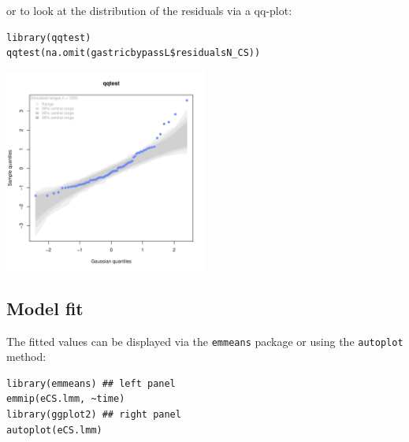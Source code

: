 \documentclass[12pt]{article}
\begin{document}
or to look at the distribution of the residuals via a qq-plot:
\lstset{language=r,label= ,caption= ,captionpos=b,numbers=none}
\begin{lstlisting}
library(qqtest)
qqtest(na.omit(gastricbypassL$residualsN_CS))
\end{lstlisting}
\begin{center}
\includegraphics[width=0.5\textwidth]{./figures/diag-qqplot.pdf}
\end{center}

\subsection{Model fit}
\label{sec:org755ae27}

The fitted values can be displayed via the \texttt{emmeans} package or using the \texttt{autoplot} method:
\lstset{language=r,label= ,caption= ,captionpos=b,numbers=none}
\begin{lstlisting}
library(emmeans) ## left panel
emmip(eCS.lmm, ~time)
library(ggplot2) ## right panel
autoplot(eCS.lmm)
\end{lstlisting}
\end{document}
